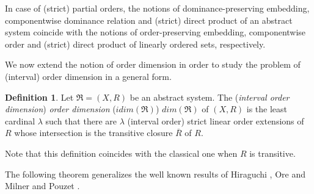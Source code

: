 \documentclass{article}
\theoremstyle{definition}
\newtheorem{definition}{Definition}[section]
\begin{document}
In case of (strict) partial orders, the notions of dominance-preserving embedding, componentwise dominance relation and  (strict) direct product of an abstract system coincide with
the notions of order-preserving embedding, componentwise order and  (strict) direct product of linearly
ordered sets, respectively. 

























We now extend the notion of order dimension in order to study the problem of
(interval) order dimension in a general form.

\begin{definition} \label{a125} Let $\mathfrak{R}=(X,R)$ be an abstract system.
The ({\it interval order dimension}) {\it order dimension} ($idim(\mathfrak{R})$) $dim(\mathfrak{R})$ of $(X,R)$ is
the least cardinal $\lambda$ such that there are $\lambda$ (interval order) strict linear order extensions of $R$ 
whose intersection is the transitive closure $\overline{R}$ of $R$.
\end{definition}


Note that this definition coincides with the classical one when $R$ is transitive.





The following theorem generalizes the well known results of Hiraguchi \cite{hir}, Ore \cite{ore} and Milner and Pouzet
\cite{MP}.
\end{document}
